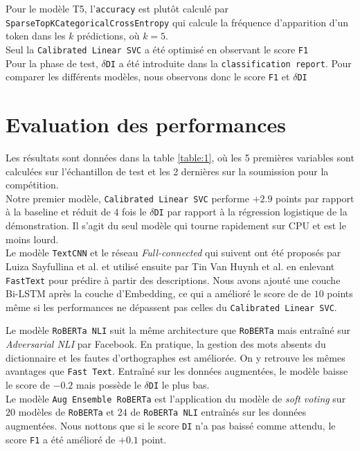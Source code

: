 Pour le modèle T5, l'\texttt{accuracy} est plutôt calculé par \texttt{SparseTopKCategoricalCrossEntropy} qui calcule la fréquence d'apparition d'un token dans les $k$ prédictions, où $k = 5$.\\
Seul la \texttt{Calibrated Linear SVC} a été optimisé en observant le score \texttt{F1}
\hfill\\

Pour la phase de test, $\delta$\texttt{DI} a été introduite dans la \texttt{classification report}. Pour comparer les différents modèles, nous observons donc le score \texttt{F1} et $\delta$\texttt{DI}

\section{Evaluation des performances}
Les résultats sont données dans la table \ref{table:1}, où les 5 premières variables sont calculées sur l'échantillon de test et les 2 dernières sur la soumission pour la compétition.
\hfill\\

Notre premier modèle, \texttt{Calibrated Linear SVC} performe $+2.9$ points par rapport à la baseline et réduit de $4$ fois le $\delta$\texttt{DI} par rapport à la régression logistique de la démonstration. Il s'agit du seul modèle qui tourne rapidement sur CPU et est le moins lourd.
\hfill\\

Le modèle \texttt{TextCNN} et le réseau \textit{Full-connected} qui suivent ont été proposés par Luiza Sayfullina et al. et utilisé ensuite par Tin Van Huynh et al. en enlevant \texttt{FastText} pour prédire à partir des descriptions. Nous avons ajouté une couche Bi-LSTM après la couche d'Embedding, ce qui a amélioré le score de de $10$ points même si les performances ne dépassent pas celles du \texttt{Calibrated Linear SVC}.

Le modèle \texttt{RoBERTa NLI} suit la même architecture que \texttt{RoBERTa} mais entraîné sur \textit{Adversarial NLI} par Facebook. En pratique, la gestion des mots absents du dictionnaire et les fautes d'orthographes est améliorée. On y retrouve les mêmes avantages que \texttt{Fast Text}. Entraîné sur les données augmentées, le modèle baisse le score de $-0.2$ mais possède le $\delta$\texttt{DI} le plus bas.\\
Le modèle \texttt{Aug Ensemble RoBERTa} est l'application du modèle de \textit{soft voting} sur $20$ modèles de \texttt{RoBERTa} et $24$ de \texttt{RoBERTa NLI} entraînés sur les données augmentées. Nous nottons que si le score \texttt{DI} n'a pas baissé comme attendu, le score \texttt{F1} a été amélioré de $+0.1$ point.
\hfill\\

